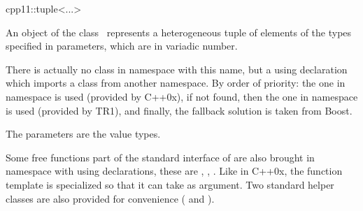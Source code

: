 

\begin{ccRefClass}{cpp11::tuple<...>}

\ccDefinition

An object of the class \ccClassTemplateName\ represents a heterogeneous tuple of elements
of the types specified in parameters, which are in variadic number.

There is actually no class in namespace  with this name, but a using declaration which
imports a class from another namespace.  By order of priority: the one in namespace
 is used (provided by C++0x), if not found, then the one in namespace
 is used (provided by TR1), and finally, the fallback solution 
is taken from Boost.


  \ccParameters

  The parameters  are the value types.


Some free functions part of the standard interface of  are also
brought in namespace  with using declarations, these are ,
, . Like in C++0x, the  function template is
specialized so that it can take  as argument.
Two standard helper classes are also provided for convenience ( and ).

\end{ccRefClass}

\ccParDims
